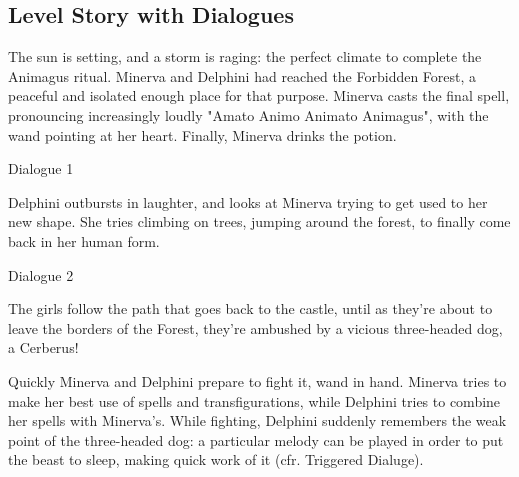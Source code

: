 \subsection{Level Story with Dialogues}

The sun is setting, and a storm is raging: the perfect climate to complete the Animagus ritual. Minerva and Delphini had reached the Forbidden Forest, a peaceful and isolated enough place for that purpose. Minerva casts the final spell, pronouncing increasingly loudly "Amato Animo Animato Animagus", with the wand pointing at her heart. Finally, Minerva drinks the potion. 


\begin{dialogue}{Dialogue 1}
\end{dialogue} 

Delphini outbursts in laughter, and looks at Minerva trying to get used to her new shape. She tries climbing on trees, jumping around the forest, to finally come back in her human form. 

\pagebreak

\begin{dialogue}{Dialogue 2}
\end{dialogue} 

The girls follow the path that goes back to the castle, until as they're about to leave the borders of the Forest, they're ambushed by a vicious three-headed dog, a Cerberus!


Quickly Minerva and Delphini prepare to fight it, wand in hand. Minerva tries to make her best use of spells and transfigurations, while Delphini tries to combine her spells with Minerva's. 
While fighting, Delphini suddenly remembers the weak point of the three-headed dog: a particular melody can be played in order to put the beast to sleep, making quick work of it (cfr. Triggered Dialuge). 

